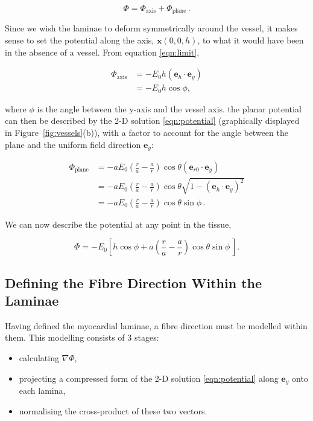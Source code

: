   \begin{equation}
    \Phi = \Phi_{\text{axis}} + \Phi_{\text{plane}}\,.
  \end{equation}
  
  Since we wish the laminae to deform symmetrically around the vessel, it makes sense to set the potential along the axis, $\mathbf{x}(0,0,h)$, to what it would have been in the absence of a vessel. From equation \ref{eqn:limit},
  
  \begin{align}
    \Phi_{\text{axis}} & = -E_0h(\mathbf{e}_h \cdot \mathbf{e}_y) \\
    & = -E_0h\cos\phi,
  \end{align}
  
  where $\phi$ is the angle between the y-axis and the vessel axis. the planar potential can then be described by the 2-D solution \ref{eqn:potential} (graphically displayed in Figure~\ref{fig:vessels}(b)), with a factor to account for the angle between the plane and the uniform field direction $\mathbf{e}_y$:
  
  \begin{align}
    \Phi_{\text{plane}} &= -aE_0\left( \frac{r}{a} - \frac{a}{r} \right) \cos \theta \left(\mathbf{e}_{r0} \cdot \mathbf{e}_y \right) \\
    &= -aE_0\left( \frac{r}{a} - \frac{a}{r} \right) \cos \theta \sqrt{ 1 - \left( \mathbf{e}_h \cdot \mathbf{e}_y \right)^2 } \\
    &= -aE_0\left( \frac{r}{a} - \frac{a}{r} \right) \cos \theta \sin \phi \, .
  \end{align}
  
  We can now describe the potential at any point in the tissue,
  
  \begin{equation}
    \Phi = -E_0\left[ h \cos \phi + a \left( \frac{r}{a} - \frac{a}{r} \right) \cos \theta \sin \phi \, \right].
    \label{eqn:potential_3D}
  \end{equation}
  

\subsection{Defining the Fibre Direction Within the Laminae}
\label{sec:defining_the_fibre_direction_within_the_laminae}
  Having defined the myocardial laminae, a fibre direction must be modelled within them. This modelling consists of 3 stages:
  
  \begin{itemize}
    \item calculating $\nabla\Phi$,
    \item projecting a compressed form of the 2-D solution \ref{eqn:potential} along $\mathbf{e}_y$ onto each lamina,
    \item normalising the cross-product of these two vectors.
  \end{itemize}
  
